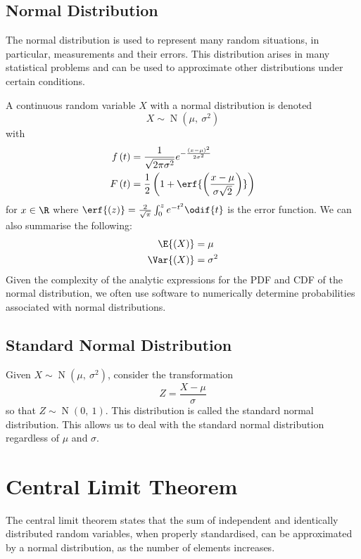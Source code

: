 \documentclass{article}
\begin{document}
\begin{multicols}{3}
    \subsection{Normal Distribution}
    The normal distribution is used to represent many random situations, in particular, measurements and their errors.
    This distribution arises in many statistical problems and can be used to \linebreak approximate other distributions
    under certain conditions.

    A continuous random variable \(X\) with a normal distribution is denoted
    \begin{equation*}
        X \sim \operatorname{N}{\left( \mu,\: \sigma^2 \right)}
    \end{equation*}
    with
    \begin{align*}
        f\left( t \right) & = \frac{1}{\sqrt{2 \pi \sigma^2}} e^{-\frac{\left( x - \mu \right)^2}{2 \sigma^2}}    \\
        F\left( t \right) & = \frac{1}{2} \left( 1 + \erf{\left( \frac{x - \mu}{\sigma \sqrt{2}} \right)} \right)
    \end{align*}
    for \(x \in \R\) where \(\erf{\left( z \right)} = \frac{2}{\sqrt{\pi}} \int_0^z e^{-t^2} \odif{t}\) is the error function.
    We can also summarise the following:
    \begin{align*}
        \E{\left( X \right)}   & = \mu      \\
        \Var{\left( X \right)} & = \sigma^2
    \end{align*}
    Given the complexity of the analytic expressions for the PDF and CDF of the normal distribution, we often
    use software to numerically determine probabilities associated with normal distributions.
    \subsection{Standard Normal Distribution}
    Given \(X \sim \operatorname{N}{\left( \mu,\: \sigma^2 \right)}\), consider the transformation
    \begin{equation*}
        Z = \frac{X - \mu}{\sigma}
    \end{equation*}
    so that \(Z \sim \operatorname{N}{\left( 0,\: 1 \right)}\). This distribution is called the standard normal distribution.
    This allows us to deal with the standard normal distribution regardless of \(\mu\) and \(\sigma\).
    \section{Central Limit Theorem}
    The central limit theorem states that the sum of independent and identically distributed random variables, when properly standardised,
    can be approximated by a normal distribution, as the number of elements increases.

\end{multicols}
\end{document}
